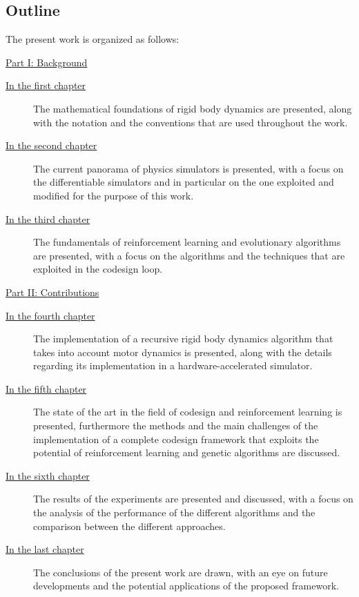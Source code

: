 \subsection*{Outline}

The present work is organized as follows:

\begin{description}

    \item{\hyperref[part:background]{Part I: Background}}

          \begin{description}
              \item[{\hyperref[chp:back_RBDynamics]{In the first chapter}}] The mathematical foundations of rigid body dynamics are presented, along with the notation and the conventions that are used throughout the work.
              \item[{\hyperref[chp:back_PhysicsSimulators]{In the second chapter}}] The current panorama of physics simulators is presented, with a focus on the differentiable simulators and in particular on the one exploited and modified for the purpose of this work.
              \item [{\hyperref[chp:back_RLGA]{In the third chapter}}] The fundamentals of reinforcement learning and evolutionary algorithms are presented, with a focus on the algorithms and the techniques that are exploited in the codesign loop.
          \end{description}

    \item{\hyperref[part:contributions]{Part II: Contributions}}

          \begin{description}
              \item[{\hyperref[chp:contrib_ABA]{In the fourth chapter}}] The  implementation of a recursive rigid body dynamics algorithm that takes into account motor dynamics is presented, along with the details regarding its implementation in a hardware-accelerated simulator.
              \item[{\hyperref[chp:contrib_CodesignRL]{In the fifth chapter}}] The state of the art  in the field of codesign and reinforcement learning is presented, furthermore the methods and the main challenges of the implementation of a complete codesign framework that exploits the potential of reinforcement learning and genetic algorithms are discussed.
              \item[{\hyperref[chp:contrib_ResultsDiscussion]{In the sixth chapter}}] The results of the experiments are presented and discussed, with a focus on the analysis of the performance of the different algorithms and the comparison between the different approaches.
              \item[{\hyperref[chp:contrib_Conclusions]{In the last chapter}}] The conclusions of the present work are drawn, with an eye on future developments and the potential applications of the proposed framework.
          \end{description}
\end{description}

